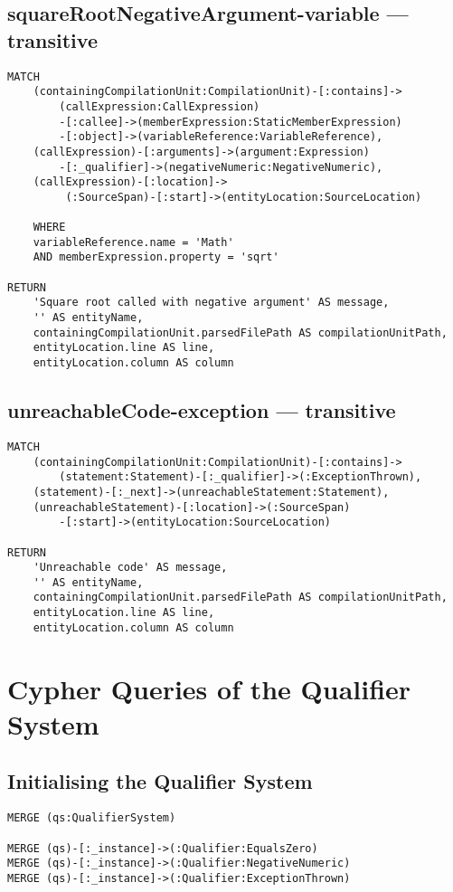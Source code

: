 \newpage
\subsection{squareRootNegativeArgument-variable — transitive}
\begin{lstlisting}[language=Cypher]
MATCH
    (containingCompilationUnit:CompilationUnit)-[:contains]->
        (callExpression:CallExpression)
        -[:callee]->(memberExpression:StaticMemberExpression)
        -[:object]->(variableReference:VariableReference),
    (callExpression)-[:arguments]->(argument:Expression)
        -[:_qualifier]->(negativeNumeric:NegativeNumeric),
    (callExpression)-[:location]->
         (:SourceSpan)-[:start]->(entityLocation:SourceLocation)

    WHERE
    variableReference.name = 'Math'
    AND memberExpression.property = 'sqrt'

RETURN
    'Square root called with negative argument' AS message,
    '' AS entityName,
    containingCompilationUnit.parsedFilePath AS compilationUnitPath,
    entityLocation.line AS line,
    entityLocation.column AS column
\end{lstlisting}


\newpage
\subsection{unreachableCode-exception — transitive}
\begin{lstlisting}[language=Cypher]
MATCH
    (containingCompilationUnit:CompilationUnit)-[:contains]->
        (statement:Statement)-[:_qualifier]->(:ExceptionThrown),
    (statement)-[:_next]->(unreachableStatement:Statement),
    (unreachableStatement)-[:location]->(:SourceSpan)
        -[:start]->(entityLocation:SourceLocation)

RETURN
    'Unreachable code' AS message,
    '' AS entityName,
    containingCompilationUnit.parsedFilePath AS compilationUnitPath,
    entityLocation.line AS line,
    entityLocation.column AS column
\end{lstlisting}


\newpage
\section{Cypher Queries of the Qualifier System}

\subsection{Initialising the Qualifier System}
\begin{lstlisting}[language=Cypher]
MERGE (qs:QualifierSystem)

MERGE (qs)-[:_instance]->(:Qualifier:EqualsZero)
MERGE (qs)-[:_instance]->(:Qualifier:NegativeNumeric)
MERGE (qs)-[:_instance]->(:Qualifier:ExceptionThrown)
\end{lstlisting}


